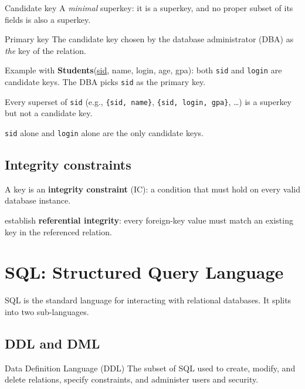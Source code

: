 \documentclass[../../dis.tex]{subfiles}
\begin{document}
\begin{concept}{Candidate key}
A \emph{minimal} superkey: it is a superkey, and no proper subset of its fields is also a superkey.
\end{concept}

\begin{concept}{Primary key}
The candidate key chosen by the database administrator (DBA) as \emph{the} key of the relation.
\end{concept}

Example with \textbf{Students}(\underline{sid}, name, login, age, gpa): both \texttt{sid} and \texttt{login} are candidate keys. The DBA picks \texttt{sid} as the primary key.

\begin{dashlist}
    \item Every superset of \texttt{sid} (e.g., \texttt{\{sid, name\}}, \texttt{\{sid, login, gpa\}}, \ldots) is a superkey but not a candidate key.
    \item \texttt{sid} alone and \texttt{login} alone are the only candidate keys.
\end{dashlist}

\subsection{Integrity constraints}
A key is an \textbf{integrity constraint} (IC): a condition that must hold on every valid database instance.

 establish \textbf{referential integrity}: every foreign-key value must match an existing key in the referenced relation.

\newpage
\section{SQL: Structured Query Language}
SQL is the standard language for interacting with relational databases. It splits into two sub-languages.

\subsection{DDL and DML}
\begin{concept}{Data Definition Language (DDL)}
The subset of SQL used to create, modify, and delete relations, specify constraints, and administer users and security.
\end{concept}
\end{document}
